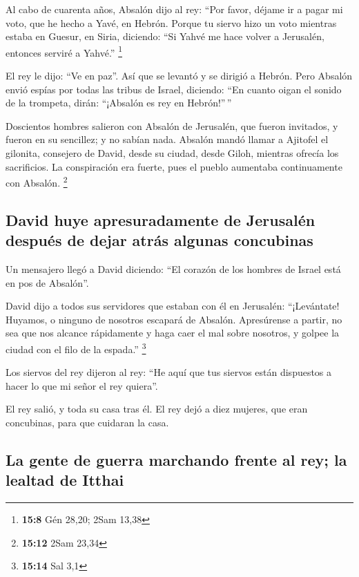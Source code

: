  Al cabo de cuarenta años, Absalón dijo al rey: ``Por
favor, déjame ir a pagar mi voto, que he hecho a Yavé, en Hebrón.
 Porque tu siervo hizo un voto mientras estaba en Guesur,
en Siria, diciendo: ``Si Yahvé me hace volver a Jerusalén, entonces
serviré a Yahvé.'' \footnote{\textbf{15:8} Gén 28,20; 2Sam 13,38}

 El rey le dijo: ``Ve en paz''. Así que se levantó y se
dirigió a Hebrón.  Pero Absalón envió espías por todas
las tribus de Israel, diciendo: ``En cuanto oigan el sonido de la
trompeta, dirán: ``¡Absalón es rey en Hebrón!''\,''

 Doscientos hombres salieron con Absalón de Jerusalén,
que fueron invitados, y fueron en su sencillez; y no sabían nada.
 Absalón mandó llamar a Ajitofel el gilonita, consejero
de David, desde su ciudad, desde Giloh, mientras ofrecía los
sacrificios. La conspiración era fuerte, pues el pueblo aumentaba
continuamente con Absalón. \footnote{\textbf{15:12} 2Sam 23,34}

\hypertarget{david-huye-apresuradamente-de-jerusaluxe9n-despuuxe9s-de-dejar-atruxe1s-algunas-concubinas}{%
\subsection{David huye apresuradamente de Jerusalén después de dejar
atrás algunas
concubinas}\label{david-huye-apresuradamente-de-jerusaluxe9n-despuuxe9s-de-dejar-atruxe1s-algunas-concubinas}}

 Un mensajero llegó a David diciendo: ``El corazón de los
hombres de Israel está en pos de Absalón''.

 David dijo a todos sus servidores que estaban con él en
Jerusalén: ``¡Levántate! Huyamos, o ninguno de nosotros escapará de
Absalón. Apresúrense a partir, no sea que nos alcance rápidamente y haga
caer el mal sobre nosotros, y golpee la ciudad con el filo de la
espada.'' \footnote{\textbf{15:14} Sal 3,1}

 Los siervos del rey dijeron al rey: ``He aquí que tus
siervos están dispuestos a hacer lo que mi señor el rey quiera''.

 El rey salió, y toda su casa tras él. El rey dejó a diez
mujeres, que eran concubinas, para que cuidaran la casa.

\hypertarget{la-gente-de-guerra-marchando-frente-al-rey-la-lealtad-de-itthai}{%
\subsection{La gente de guerra marchando frente al rey; la lealtad de
Itthai}\label{la-gente-de-guerra-marchando-frente-al-rey-la-lealtad-de-itthai}}


